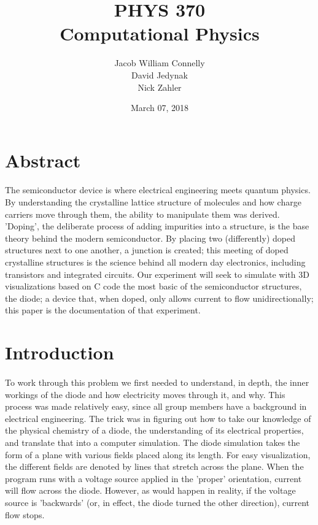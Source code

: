 \documentclass[a4paper]{article}
\title{PHYS 370\\
Computational Physics\\}
\author{Jacob William Connelly\\
David Jedynak\\
Nick Zahler}
\date{March 07, 2018}
\begin{document}
\maketitle

\section{Abstract}
\paragraph{}
The semiconductor device is where electrical engineering meets quantum physics. By understanding the crystalline lattice structure of molecules and how charge carriers move through them, the ability to manipulate them was derived. 'Doping', the deliberate process of adding impurities into a structure, is the base theory behind the modern semiconductor. By placing two (differently) doped structures next to one another, a junction is created; this meeting of doped crystalline structures is the science behind all modern day electronics, including transistors and integrated circuits. Our experiment will seek to simulate with 3D visualizations based on C code the most basic of the semiconductor structures, the diode; a device that, when doped, only allows current to flow unidirectionally; this paper is the documentation of that experiment.

\section{Introduction}
\paragraph{}
To work through this problem we first needed to understand, in depth, the inner workings of the diode and how electricity moves through it, and why. This process was made relatively easy, since all group members have a background in electrical engineering. The trick was in figuring out how to take our knowledge of the physical chemistry of a diode, the understanding of its electrical properties, and translate that into a computer simulation. 
	The diode simulation takes the form of a plane with various fields placed along its length. For easy visualization, the different fields are denoted by lines that stretch across the plane. When the program runs with a voltage source applied in the 'proper' orientation, current will flow across the diode. However, as would happen in reality, if the voltage source is 'backwards' (or, in effect, the diode turned the other direction), current flow stops. \\
    
\end{document}
